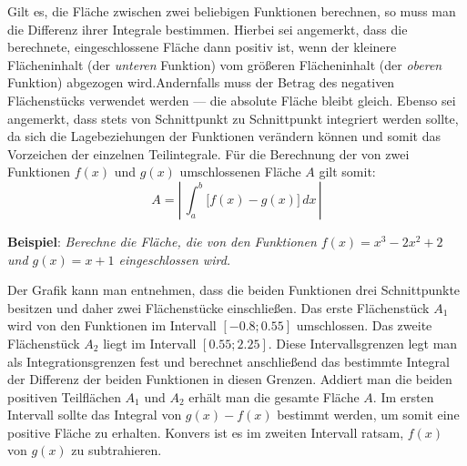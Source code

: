 \pagebreak


Gilt es, die Fl\"{a}che zwischen zwei beliebigen Funktionen berechnen, so muss man die Differenz ihrer Integrale bestimmen. Hierbei sei angemerkt, dass die berechnete, eingeschlossene Fl\"{a}che dann positiv ist, wenn der kleinere Fl\"{a}cheninhalt (der \emph{unteren} Funktion) vom gr\"{o}\ss{}eren Fl\"{a}cheninhalt (der \emph{oberen} Funktion) abgezogen wird.Andernfalls muss der Betrag des negativen Fl\"{a}chenst\"{u}cks verwendet werden --- die absolute Fl\"{a}che bleibt gleich. Ebenso sei angemerkt, dass stets von Schnittpunkt zu Schnittpunkt integriert werden sollte, da sich die Lagebeziehungen der Funktionen ver\"{a}ndern k\"{o}nnen und somit das Vorzeichen der einzelnen Teilintegrale. F\"{u}r die Berechnung der von zwei Funktionen $f(x)$ und $g(x)$ umschlossenen Fl\"{a}che $A$ gilt somit: $$A = \left| \, \int_a^b \big[f(x) - g(x)\big] \, dx \, \right|$$

\textbf{Beispiel}: \emph{Berechne die Fl\"{a}che, die von den Funktionen $f(x) = x^3 - 2x^2 + 2$ und $g(x) = x + 1$ eingeschlossen wird.}

\extrapar

\begin{figure}[h!]
	\centering
\end{figure}

Der Grafik kann man entnehmen, dass die beiden Funktionen drei Schnittpunkte besitzen und daher zwei Fl\"{a}chenst\"{u}cke einschlie\ss{}en. Das erste Fl\"{a}chenst\"{u}ck $A_1$ wird von den Funktionen im Intervall $[-0.8 ; 0.55]$ umschlossen. Das zweite Fl\"{a}chenst\"{u}ck $A_2$ liegt im Intervall $[0.55 ; 2.25]$. Diese Intervallsgrenzen legt man als Integrationsgrenzen fest und berechnet anschlie\ss{}end das bestimmte Integral der Differenz der beiden Funktionen in diesen Grenzen. Addiert man die beiden positiven Teilfl\"{a}chen $A_1$ und $A_2$ erh\"{a}lt man die gesamte Fl\"{a}che $A$. Im ersten Intervall sollte das Integral von $g(x) - f(x)$ bestimmt werden, um somit eine positive Fl\"{a}che zu erhalten. Konvers ist es im zweiten Intervall ratsam, $f(x)$ von $g(x)$ zu subtrahieren. 

